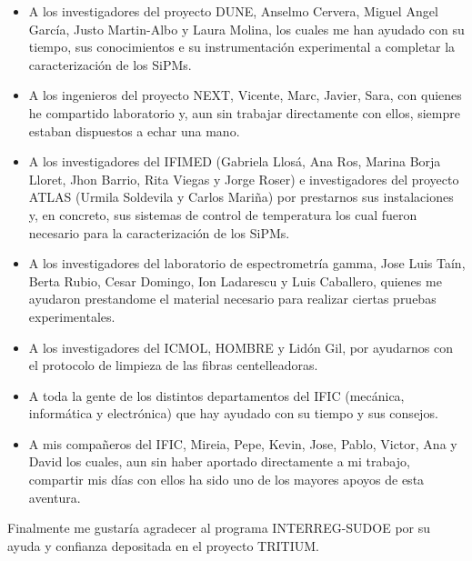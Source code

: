\begin{itemize}

\item{} A los investigadores del proyecto DUNE, Anselmo Cervera, Miguel Angel García, Justo Martin-Albo y Laura Molina, los cuales me han ayudado con su tiempo, sus conocimientos e su instrumentación experimental a completar la caracterización de los SiPMs. 

\item{} A los ingenieros del proyecto NEXT, Vicente, Marc, Javier, Sara, con quienes he compartido laboratorio y, aun sin trabajar directamente con ellos, siempre estaban dispuestos a echar una mano. 

\item{} A los investigadores del IFIMED (Gabriela Llosá, Ana Ros, Marina Borja Lloret, Jhon Barrio, Rita Viegas y Jorge Roser) e investigadores del proyecto ATLAS (Urmila Soldevila y Carlos Mariña) por prestarnos sus instalaciones y, en concreto, sus sistemas de control de temperatura los cual fueron necesario para la caracterización de los SiPMs. 

\item{} A los investigadores del laboratorio de espectrometría gamma, Jose Luis Taín, Berta Rubio, Cesar Domingo, Ion Ladarescu y Luis Caballero, quienes me ayudaron prestandome el material necesario para realizar ciertas pruebas experimentales.

\item{} A los investigadores del ICMOL, HOMBRE y Lidón Gil, por ayudarnos con el protocolo de limpieza de las fibras centelleadoras.

\item{} A toda la gente de los distintos departamentos del IFIC (mecánica, informática y electrónica) que hay ayudado con su tiempo y sus consejos.

\item{} A mis compañeros del IFIC, Mireia, Pepe, Kevin, Jose, Pablo, Victor, Ana y David los cuales, aun sin haber aportado directamente a mi trabajo, compartir mis días con ellos ha sido uno de los mayores apoyos de esta aventura.

\end{itemize} 

Finalmente me gustaría agradecer al programa INTERREG-SUDOE por su ayuda y confianza depositada en el proyecto TRITIUM.